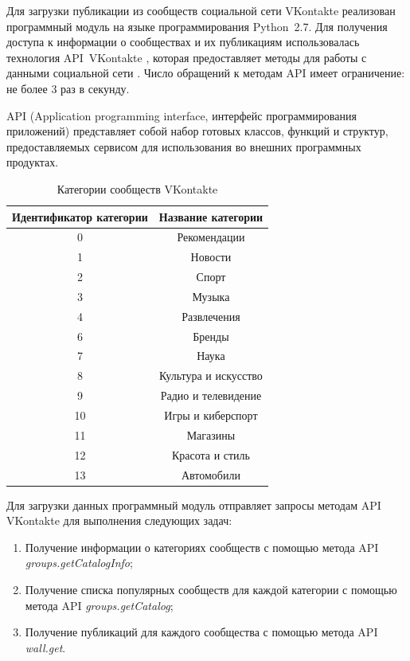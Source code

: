 \documentclass[a4paper]{report}
\begin{document}
	
	Для загрузки публикации из сообществ социальной сети VKontakte реализован программный модуль на языке программирования Python~2.7. 
	Для получения доступа к информации о сообществах и их публикациям использовалась технология API~VKontakte \cite{bib:vkapi}, которая предоставляет методы для работы с данными социальной сети \cite{bib:methods}. Число обращений к методам API имеет ограничение: не более 3 раз в секунду.
	
	API (Application programming interface, интерфейс программирования приложений) представляет собой набор готовых классов, функций и структур, предоставляемых сервисом для использования во внешних программных продуктах. 
	
	\setlength\extrarowheight{5pt}
\begin{table}[h]
\centering
\begin{tabular}{|c|c|}
\hline
\textbf{Идентификатор категории} & \textbf{Название категории} \\  \hline 
0 & Рекомендации \\ \hline
1 & Новости \\ \hline
2 & Спорт \\ \hline
3 & Музыка \\ \hline
4 & Развлечения \\ \hline
6 & Бренды \\ \hline
7 & Наука \\ \hline
8 & Культура и искусство \\ \hline
9 & Радио и телевидение \\ \hline
10 & Игры и киберспорт \\ \hline
11 & Магазины \\ \hline
12 & Красота и стиль \\ \hline
13 & Автомобили \\ \hline
\end{tabular}
\caption{Категории сообществ VKontakte}
\label{table1}
\end{table}
	
	Для загрузки данных программный модуль отправляет запросы методам API VKontakte для выполнения следующих задач:
	
	\begin{enumerate}
	\item{Получение информации о категориях сообществ с помощью метода API \textit{groups.getCatalogInfo};}
	\item{Получение списка популярных сообществ для каждой категории с помощью метода API \textit{groups.getCatalog};}
	\item{Получение публикаций для каждого сообщества с помощью метода API \textit{wall.get}.}
	
	\end{enumerate}
	
\end{document}
